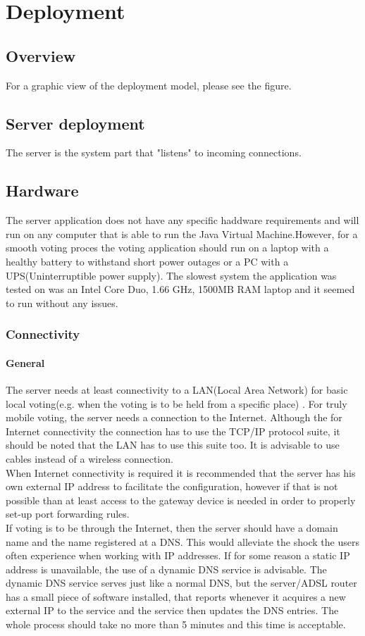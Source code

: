 \documentclass[11pt,twoside,a4paper]{book}
\begin{document}
 \chapter{Deployment}
\section{Overview}
For a graphic view of the deployment model, please see the figure. 
\section{Server deployment}
The server is the system part that "listens" to incoming connections.
\section{Hardware}
The server application does not have any specific haddware requirements and will run on any computer that is able to run the Java Virtual Machine.However, for a smooth voting proces the voting application should run on a laptop with a healthy battery to withstand short power outages or a PC with a UPS(Uninterruptible power supply). The slowest system the application was tested on was an Intel Core Duo, 1.66 GHz, 1500MB RAM laptop and it seemed to run without any issues. 
\subsection{Connectivity}
\subsubsection{General}
The server needs at least connectivity to a LAN(Local Area Network) for basic local voting(e.g. when the voting is to be held from a specific place) . For truly mobile voting, the server needs a connection to the Internet. Although the for Internet connectivity the connection has to use the TCP/IP protocol  suite, it should be noted that the LAN has to use this suite too. It is advisable to use cables instead of a wireless connection. \\
When Internet connectivity is required it is recommended that the server has his own external IP address to facilitate the configuration, however if that is not possible than at least access to the gateway device is needed in order to properly set-up port forwarding rules.
\\
If voting is to be through the Internet, then the server should have a domain name and the name registered at a DNS. This would alleviate the shock the users often experience when working with IP addresses. If for some reason a static IP address is unavailable, the use of a dynamic DNS service is advisable. The dynamic DNS service serves just like a normal DNS, but the server/ADSL router has a small piece of software installed, that reports whenever it acquires a new external IP to the service and the service then updates the DNS entries. The whole process should take no more than 5 minutes and this time is acceptable.
\\
\end{document}
